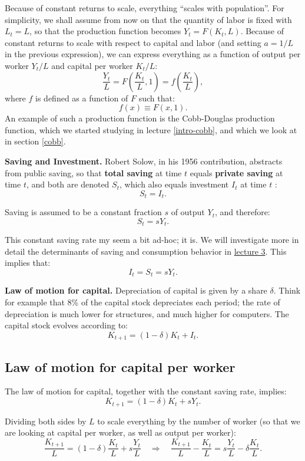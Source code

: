 \documentclass[]{book}
\begin{document}
Because of constant returns to scale, everything ``scales with
population''. For simplicity, we shall assume from now on that the
quantity of labor is fixed with \(L_t=L\), so that the production
function becomes \(Y_t=F(K_t, L)\). Because of constant returns to scale
with respect to capital and labor (and setting \(a=1/L\) in the previous
expression), we can express everything as a function of output per
worker \(Y_t/L\) and capital per worker \(K_t/L\):
\[\frac{Y_t}{L}=F\left(\frac{K_t}{L},1\right)=f\left(\frac{K_t}{L}\right),\]
where \(f\) is defined as a function of \(F\) such that:
\[f(x)\equiv F(x,1).\] An example of such a production function is the
Cobb-Douglas production function, which we started studying in lecture
\ref{intro-cobb}, and which we look at in section \ref{cobb}.

\textbf{Saving and Investment.} Robert Solow, in his 1956 contribution,
abstracts from public saving, so that \textbf{total saving} at time
\(t\) equals \textbf{private saving} at time \(t\), and both are denoted
\(S_{t}\), which also equals investment \(I_{t}\) at time \(t\) :
\[S_{t}=I_{t}.\]

Saving is assumed to be a constant fraction \(s\) of output \(Y_{t}\),
and therefore: \[S_{t}=sY_{t}.\]

This constant saving rate my seem a bit ad-hoc; it is. We will
investigate more in detail the determinants of saving and consumption
behavior in \protect\hyperlink{two-period}{lecture 3}. This implies
that: \[\boxed{I_t = S_t = sY_t}.\]

\textbf{Law of motion for capital.} Depreciation of capital is given by
a share \(\delta\). Think for example that 8\% of the capital stock
depreciates each period; the rate of depreciation is much lower for
structures, and much higher for computers. The capital stock evolves
according to: \[\boxed{K_{t+1}=\left(1-\delta\right)K_{t}+I_{t}}.\]

\subsection{Law of motion for capital per
worker}\label{law-of-motion-for-capital-per-worker}

The law of motion for capital, together with the constant saving rate,
implies: \[K_{t+1}=\left(1-\delta\right)K_{t}+sY_t.\]

Dividing both sides by \(L\) to scale everything by the number of worker
(so that we are looking at capital per worker, as well as output per
worker):
\[\frac{K_{t+1}}{L} =\left(1-\delta\right)\frac{K_{t}}{L}+s\frac{Y_{t}}{L}\quad\Rightarrow\quad\boxed{\frac{K_{t+1}}{L}-\frac{K_{t}}{L}=s\frac{Y_{t}}{L}-\delta\frac{K_{t}}{L}}.\]
\end{document}
